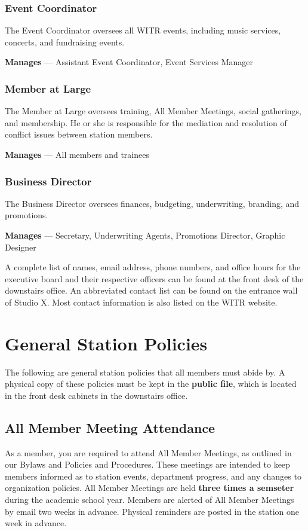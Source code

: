 \documentclass{witrman}
\begin{document}
\subsection{Event Coordinator}
The Event Coordinator oversees all WITR events, including music services,
concerts, and fundraising events.

\textbf{Manages} --- Assistant Event Coordinator, Event Services Manager

\subsection{Member at Large}
The Member at Large oversees training, All Member Meetings, social gatherings,
and membership. He or she is responsible for the mediation and resolution of
conflict issues between station members.

\textbf{Manages} --- All members and trainees

\subsection{Business Director}
The Business Director oversees finances, budgeting, underwriting, branding, and
promotions.

\textbf{Manages} --- Secretary, Underwriting Agents, Promotions Director,
Graphic Designer

A complete list of names, email address, phone numbers, and office hours for the
executive board and their respective officers can be found at the front desk of
the downstairs office.  An abbreviated contact list can be found on the entrance
wall of Studio X.  Most contact information is also listed on the WITR website.

\chapter{General Station Policies}

The following are general station policies that all members must abide by. A
physical copy of these policies must be kept in the \textbf{public file}, which
is located in the front desk cabinets in the downstairs office.

\section{All Member Meeting Attendance}
As a member, you are required to attend All Member Meetings, as outlined in our
Bylaws and Policies and Procedures.  These meetings are intended to keep members
informed as to station events, department progress, and any changes to
organization policies.  All Member Meetings are held \textbf{three times a
semseter} during the academic school year. Members are alerted of All Member
Meetings by email two weeks in advance. Physical reminders are posted in the
station one week in advance.
\end{document}
